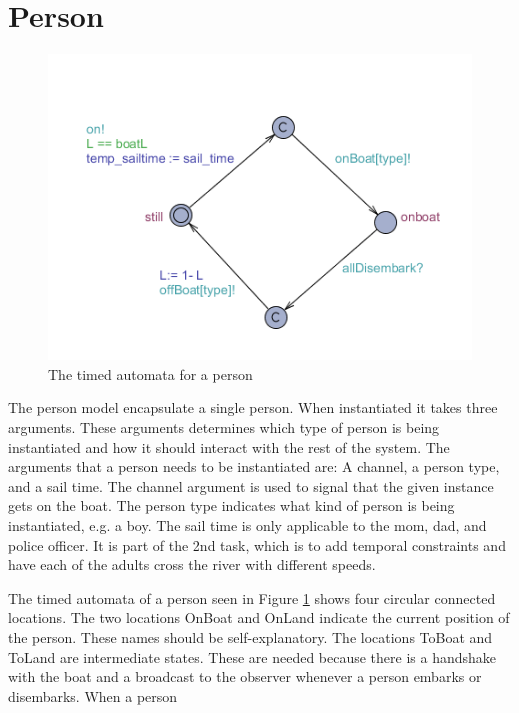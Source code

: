 \section{Person}
\begin{figure}%
\includegraphics[width=\columnwidth]{pictures/person.png}%
\caption{The timed automata for a person}%
\label{fig:person}%
\end{figure}
The person model encapsulate a single person.
When instantiated it takes three arguments.
These arguments determines which type of person is being instantiated and how it should interact with the rest of the system.
The arguments that a person needs to be instantiated are: A channel, a person type, and a sail time.
The channel argument is used to signal that the given instance gets on the boat.
The person type indicates what kind of person is being instantiated, e.g. a boy.
The sail time is only applicable to the mom, dad, and police officer.
It is part of the 2nd task, which is to add temporal constraints and have each of the adults cross the river with different speeds.

The timed automata of a person seen in Figure \ref{fig:person} shows four circular connected locations.
The two locations OnBoat and OnLand indicate the current position of the person.
These names should be self-explanatory.
The locations ToBoat and ToLand are intermediate states.
These are needed because there is a handshake with the boat and a broadcast to the observer whenever a person embarks or disembarks.
When a person 















